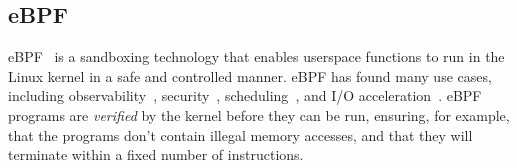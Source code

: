 \subsection{eBPF}

eBPF~\cite{ebpf} is a sandboxing technology that enables userspace functions to run in the Linux kernel in a safe and controlled manner. %
eBPF has found many use cases, including observability~\cite{gc-observability-bpf}, security~\cite{bpf-iptables,seccomp-bpf}, scheduling~\cite{sched_ext, syrup, ghost}, and I/O acceleration~\cite{xrp, xdp, electrode, dint, bpfof}. eBPF programs are \emph{verified} by the kernel before they can be run, ensuring, for example, that the programs don't contain illegal memory accesses, and that they will terminate within a fixed number of instructions. %

